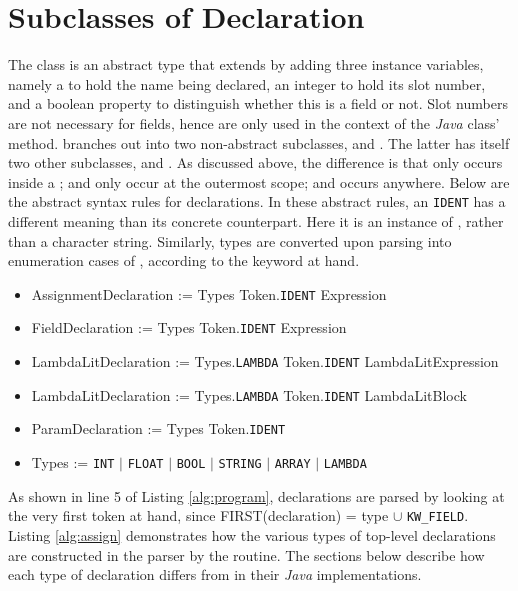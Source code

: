 \section{Subclasses of Declaration}

The class  is an abstract type that extends  by adding three instance variables, namely a  to hold the name being declared, an integer to hold its slot number, and a boolean property to distinguish whether this is a field or not. Slot numbers are not necessary for fields, hence are only used in the context of the \emph{Java} class'  method.  branches out into two non-abstract subclasses,  and . The latter has itself two other subclasses,  and . As discussed above, the difference is that  only occurs inside a ;  and  only occur at the outermost scope; and  occurs anywhere. Below are the abstract syntax rules for declarations. In these abstract rules, an \texttt{IDENT} has a different meaning than its concrete counterpart. Here it is an instance of , rather than a character string. Similarly, types are converted upon parsing into enumeration cases of , according to the keyword at hand.

\begin{itemize}
	\item AssignmentDeclaration := Types Token.\texttt{IDENT} Expression
	\item FieldDeclaration := Types Token.\texttt{IDENT} Expression
	\item LambdaLitDeclaration := Types.\texttt{LAMBDA} Token.\texttt{IDENT} LambdaLitExpression
	\item LambdaLitDeclaration := Types.\texttt{LAMBDA} Token.\texttt{IDENT} LambdaLitBlock
	\item ParamDeclaration := Types Token.\texttt{IDENT}
	\item Types := \texttt{INT} $|$ \texttt{FLOAT} $|$ \texttt{BOOL} $|$ \texttt{STRING} $|$ \texttt{ARRAY} $|$ \texttt{LAMBDA}
\end{itemize}

As shown in line 5 of Listing \ref{alg:program}, declarations are parsed by looking at the very first token at hand, since FIRST(declaration) = type $\cup$ \texttt{KW\_FIELD}. Listing \ref{alg:assign} demonstrates how the various types of top-level declarations are constructed in the parser by the  routine. The sections below describe how each type of declaration differs from  in their \emph{Java} implementations.

